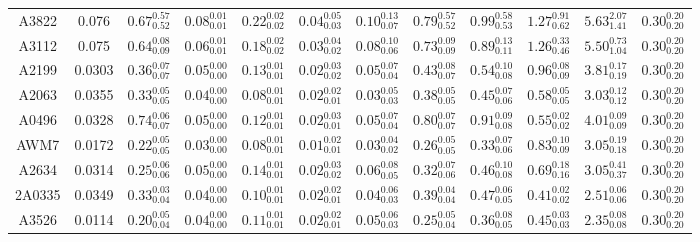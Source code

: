 \begin{table}
\begin{ruledtabular}
\begin{tabular}{c c c c c c c c c c c c}
     A3822 & 0.076 & $0.67^{0.57}_{0.52}$ & $0.08^{0.01}_{0.01}$ & $0.22^{0.02}_{0.02}$ & $0.04^{0.05}_{0.03}$ & $0.10^{0.13}_{0.07}$ & $0.79^{0.57}_{0.52}$ & $0.99^{0.58}_{0.53}$ & $1.27^{0.91}_{0.62}$ & $5.63^{2.07}_{1.41}$ & $0.30^{0.20}_{0.20}$ \\
     A3112 & 0.075 & $0.64^{0.08}_{0.09}$ & $0.06^{0.01}_{0.01}$ & $0.18^{0.02}_{0.02}$ & $0.03^{0.04}_{0.02}$ & $0.08^{0.10}_{0.06}$ & $0.73^{0.09}_{0.09}$ & $0.89^{0.13}_{0.11}$ & $1.26^{0.33}_{0.46}$ & $5.50^{0.73}_{1.04}$ & $0.30^{0.20}_{0.20}$ \\
     A2199 & 0.0303 & $0.36^{0.07}_{0.07}$ & $0.05^{0.00}_{0.00}$ & $0.13^{0.01}_{0.01}$ & $0.02^{0.03}_{0.02}$ & $0.05^{0.07}_{0.04}$ & $0.43^{0.08}_{0.07}$ & $0.54^{0.10}_{0.08}$ & $0.96^{0.08}_{0.09}$ & $3.81^{0.17}_{0.19}$ & $0.30^{0.20}_{0.20}$ \\
     A2063 & 0.0355 & $0.33^{0.05}_{0.05}$ & $0.04^{0.00}_{0.00}$ & $0.08^{0.01}_{0.01}$ & $0.02^{0.02}_{0.01}$ & $0.03^{0.05}_{0.03}$ & $0.38^{0.05}_{0.05}$ & $0.45^{0.07}_{0.06}$ & $0.58^{0.05}_{0.05}$ & $3.03^{0.12}_{0.12}$ & $0.30^{0.20}_{0.20}$ \\
     A0496 & 0.0328 & $0.74^{0.06}_{0.07}$ & $0.05^{0.00}_{0.00}$ & $0.12^{0.01}_{0.01}$ & $0.02^{0.03}_{0.01}$ & $0.05^{0.07}_{0.04}$ & $0.80^{0.07}_{0.07}$ & $0.91^{0.09}_{0.08}$ & $0.55^{0.02}_{0.02}$ & $4.01^{0.09}_{0.09}$ & $0.30^{0.20}_{0.20}$ \\
     AWM7 & 0.0172 & $0.22^{0.05}_{0.05}$ & $0.03^{0.00}_{0.00}$ & $0.08^{0.01}_{0.01}$ & $0.01^{0.02}_{0.01}$ & $0.03^{0.04}_{0.02}$ & $0.26^{0.05}_{0.05}$ & $0.33^{0.07}_{0.06}$ & $0.83^{0.10}_{0.09}$ & $3.05^{0.19}_{0.18}$ & $0.30^{0.20}_{0.20}$ \\
     A2634 & 0.0314 & $0.25^{0.06}_{0.06}$ & $0.05^{0.00}_{0.00}$ & $0.14^{0.01}_{0.01}$ & $0.02^{0.03}_{0.02}$ & $0.06^{0.08}_{0.05}$ & $0.32^{0.07}_{0.06}$ & $0.46^{0.10}_{0.08}$ & $0.69^{0.18}_{0.16}$ & $3.05^{0.41}_{0.37}$ & $0.30^{0.20}_{0.20}$ \\
     2A0335 & 0.0349 & $0.33^{0.03}_{0.04}$ & $0.04^{0.00}_{0.00}$ & $0.10^{0.01}_{0.01}$ & $0.02^{0.02}_{0.01}$ & $0.04^{0.06}_{0.03}$ & $0.39^{0.04}_{0.04}$ & $0.47^{0.06}_{0.05}$ & $0.41^{0.02}_{0.02}$ & $2.51^{0.06}_{0.06}$ & $0.30^{0.20}_{0.20}$ \\
     A3526 & 0.0114 & $0.20^{0.05}_{0.04}$ & $0.04^{0.00}_{0.00}$ & $0.11^{0.01}_{0.01}$ & $0.02^{0.02}_{0.01}$ & $0.05^{0.06}_{0.03}$ & $0.25^{0.05}_{0.04}$ & $0.36^{0.08}_{0.05}$ & $0.45^{0.03}_{0.03}$ & $2.35^{0.08}_{0.08}$ & $0.30^{0.20}_{0.20}$ \\

\end{tabular}
\end{ruledtabular}
\end{table}
